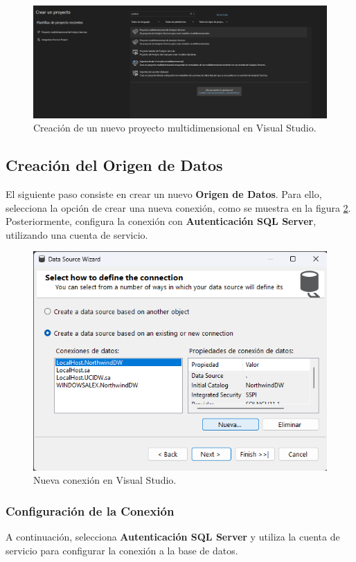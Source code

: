 \documentclass{article}
\begin{document}
\begin{figure}[H]
	\begin{center} 
		\includegraphics[width=\textwidth]{images/plantilla.png}
		\caption{Creación de un nuevo proyecto multidimensional en Visual Studio.}
		\label{fig:plantilla}
	\end{center}
\end{figure}

\subsection{Creación del Origen de Datos}
El siguiente paso consiste en crear un nuevo \textbf{Origen de Datos}. Para ello, selecciona la opción de crear una nueva conexión, como se muestra en la figura \ref{fig:conexion}. Posteriormente, configura la conexión con \textbf{Autenticación SQL Server}, utilizando una cuenta de servicio.

\begin{figure}[H]
	\begin{center} 
		\includegraphics[width=.7\textwidth]{images/conexion.png}
		\caption{Nueva conexión en Visual Studio.}
		\label{fig:conexion}
	\end{center}
\end{figure}

\subsubsection{Configuración de la Conexión}
A continuación, selecciona \textbf{Autenticación SQL Server} y utiliza la cuenta de servicio para configurar la conexión a la base de datos.
\end{document}
